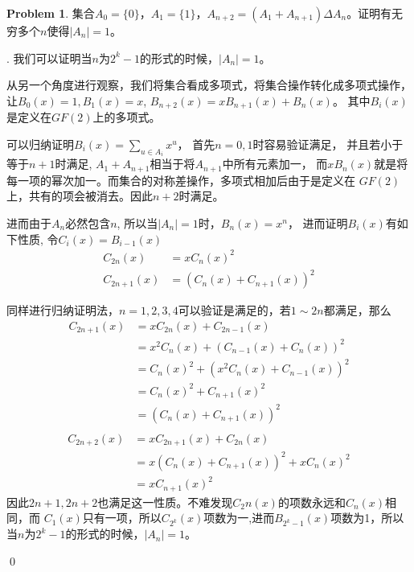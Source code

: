\documentclass[UTF8]{ctexart}
\newenvironment{sol}
  {\par\vspace{3mm}\noindent{\it Solution}.}
  {\qed \\ \medskip}
\theoremstyle{definition}
\newtheorem{problem}{Problem}
\begin{document}
\newpage
\begin{problem}
集合$A_0=\{0\}$，$A_1=\{1\}$，$A_{n+2} = (A_1 + A_{n+1}) \Delta A_{n}$。证明有无穷多个$n$使得$|A_n|=1$。
    \begin{sol}
        我们可以证明当$n$为$2^k-1$的形式的时候，$|A_n|=1$。

        从另一个角度进行观察，我们将集合看成多项式，将集合操作转化成多项式操作，
        让$B_0(x) = 1, B_1(x) = x$, $B_{n+2}(x)=xB_{n+1}(x) + B_n(x)$。
        其中$B_i(x)$是定义在$GF(2)$上的多项式。

        可以归纳证明$B_i(x)=\sum_{u \in A_i} x^u$，
        首先$n=0,1$时容易验证满足，
        并且若小于等于$n+1$时满足, $A_1 + A_{n+1}$相当于将$A_{n+1}$中所有元素加一，
        而$xB_n(x)$就是将每一项的幂次加一。而集合的对称差操作，多项式相加后由于是定义在
        $GF(2)$上，共有的项会被消去。因此$n+2$时满足。

        进而由于$A_n$必然包含$n$, 所以当$|A_n|=1$时，$B_n(x) = x^n$，
        进而证明$B_i(x)$有如下性质, 令$C_i(x)=B_{i-1}(x)$
        \begin{align*}                
            C_{2n}(x)&=xC_n(x)^2 \\
            C_{2n+1}(x)&=(C_n(x)+C_{n+1}(x))^2
        \end{align*}
        
        同样进行归纳证明法，$n=1,2,3,4$可以验证是满足的，若$1\sim 2n$都满足，那么
        \begin{align*}
            C_{2n+1}(x)
            &=xC_{2n}(x)+C_{2n-1}(x) \\
            &=x^2C_{n}(x)+(C_{n-1}(x)+C_n(x))^2 \\
            &=C_n(x)^2 + (x^2C_n(x)+C_{n-1}(x))^2\\
            &=C_n(x)^2 + C_{n+1}(x)^2 \\
            &=(C_n(x) + C_{n+1}(x))^2 \\
        \end{align*}
        \begin{align*}
            C_{2n+2}(x)
            &=xC_{2n+1}(x)+C_{2n}(x) \\
            &=x(C_n(x)+C_{n+1}(x))^2+xC_n(x)^2\\
            &=xC_{n+1}(x)^2
        \end{align*}
        因此$2n+1,2n+2$也满足这一性质。不难发现$C_2n(x)$的项数永远和$C_n(x)$相同，而
        $C_1(x)$只有一项，所以$C_{2^k}(x)$项数为一,进而$B_{2^k-1}(x)$项数为1，所以
        当$n$为$2^k-1$的形式的时候，$|A_n|=1$。

    \end{sol}
\end{problem}
\end{document}
